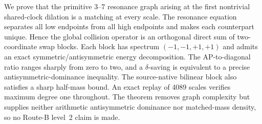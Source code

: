 We prove that the primitive $3$--$7$ resonance graph arising at the first nontrivial
shared-clock dilation is a matching at every scale.  The resonance equation separates
all low endpoints from all high endpoints and makes each counterpart unique.  Hence the
global collision operator is an orthogonal direct sum of two-coordinate swap blocks.
Each block has spectrum $(-1,-1,+1,+1)$ and admits an exact symmetric/antisymmetric
energy decomposition.  The AP-to-diagonal ratio ranges sharply from zero to two, and a
$\delta$-saving is equivalent to a precise antisymmetric-dominance inequality.  The
source-native bilinear block also satisfies a sharp half-mass bound.  An exact replay of
4089 scales verifies maximum degree one throughout.  The theorem removes graph
complexity but supplies neither arithmetic antisymmetric dominance nor matched-mass
density, so no Route-B level~2 claim is made.
